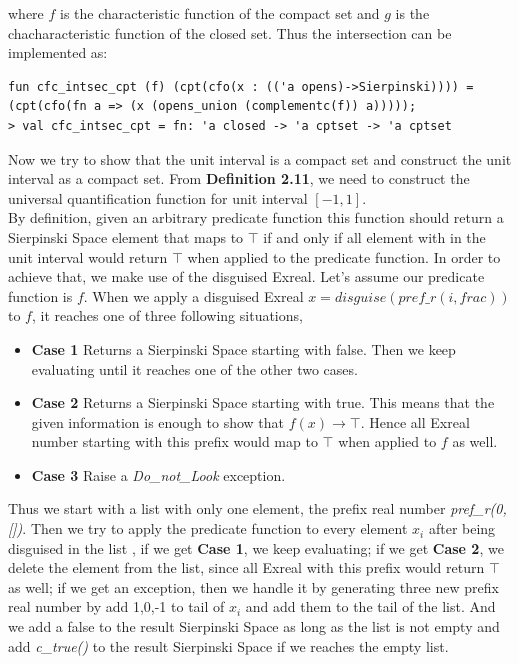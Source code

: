 \documentclass[12pt,twoside,notitlepage]{report}
\begin{document}
where $f$ is the characteristic function of the compact set and $g$ is the chacharacteristic function of the closed set.
Thus the intersection can be implemented as:

{
\begin{verbatim}
fun cfc_intsec_cpt (f) (cpt(cfo(x : (('a opens)->Sierpinski)))) = 
(cpt(cfo(fn a => (x (opens_union (complementc(f)) a)))));
> val cfc_intsec_cpt = fn: 'a closed -> 'a cptset -> 'a cptset
\end{verbatim}
}

Now we try to show that the unit interval is a compact set and construct the unit interval as a compact set.
From \textbf{Definition 2.11}, we need to construct the universal quantification function for unit interval $[-1,1]$. \\
By definition, given an arbitrary predicate function this function should return a Sierpinski Space element that maps to $\top$ if and only if all element with in the unit interval would return $\top$ when applied to the predicate function.
In order to achieve that, we make use of the disguised Exreal. Let's assume our predicate function is $f$. When we apply a disguised Exreal $x = disguise (pref\_r(i,frac))$ to $f$, it reaches one of three following situations,

\begin{itemize}
\item \textbf{Case 1} Returns a Sierpinski Space starting with false. Then we keep evaluating until it reaches one of the other two cases.
\item \textbf{Case 2} Returns a Sierpinski Space starting with true. This means that the given information is enough to show that $f(x) \to \top$. Hence all Exreal number starting with this prefix would map to $\top$ when applied to $f$ as well.  
\item \textbf{Case 3} Raise a \textit{Do\_not\_Look} exception.
\end{itemize} 

Thus we start with a list with only one element, the prefix real number \textit{pref\_r(0,[])}.  Then we try to apply the predicate function to every element $x_i$ after being disguised in the list , if we get \textbf{Case 1}, we keep evaluating; if we get \textbf{Case 2}, we delete the element from the list, since all Exreal with this prefix would return $\top$ as well; if we get an exception, then we handle it by generating three new prefix real number by add 1,0,-1 to tail of $x_i$ and add them to the tail of the list.  And we add a false to the result Sierpinski Space as long as the list is not empty and add \textit{c\_true()} to the result Sierpinski Space if we reaches the empty list.
\end{document}
